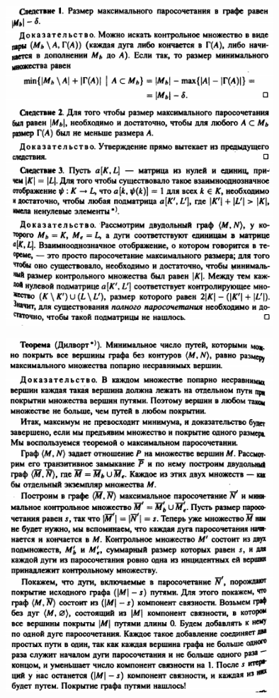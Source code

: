 \documentclass[discrete.tex]{subfiles}
\begin{document}
\begin{figure}[H]
        \includegraphics[width=10cm]{pics/49_5}
        \centering
\end{figure}

\begin{figure}[H]
        \includegraphics[width=10cm]{pics/49_6}
        \centering
\end{figure}
\end{document}
